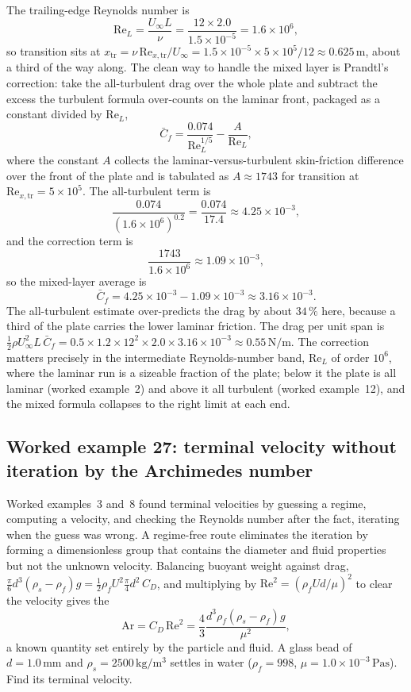 The trailing-edge Reynolds number is
\[
\text{Re}_L = \frac{U_\infty L}{\nu} = \frac{12\times2.0}{1.5\times
10^{-5}} = 1.6\times10^{6},
\]
so transition sits at $x_{\text{tr}} = \nu\,\text{Re}_{x,\text{tr}}/
U_\infty = 1.5\times10^{-5}\times5\times10^{5}/12 \approx 0.625\,\si{
\meter}$, about a third of the way along. The clean way to handle the
mixed layer is Prandtl's correction: take the all-turbulent drag over
the whole plate and subtract the excess the turbulent formula
over-counts on the laminar front, packaged as a constant divided by
$\text{Re}_L$,
\[
\bar C_f = \frac{0.074}{\text{Re}_L^{1/5}} - \frac{A}{\text{Re}_L},
\]
where the constant $A$ collects the laminar-versus-turbulent
skin-friction difference over the front of the plate and is tabulated
as $A \approx 1743$ for transition at $\text{Re}_{x,\text{tr}} =
5\times10^{5}$. The all-turbulent term is
\[
\frac{0.074}{(1.6\times10^{6})^{0.2}} = \frac{0.074}{17.4} \approx
4.25\times10^{-3},
\]
and the correction term is
\[
\frac{1743}{1.6\times10^{6}} \approx 1.09\times10^{-3},
\]
so the mixed-layer average is
\[
\bar C_f = 4.25\times10^{-3} - 1.09\times10^{-3} \approx 3.16\times
10^{-3}.
\]
The all-turbulent estimate over-predicts the drag by about $34\,\%$
here, because a third of the plate carries the lower laminar friction.
The drag per unit span is $\tfrac12\rho U_\infty^2 L\,\bar C_f = 0.5
\times1.2\times12^2\times2.0\times3.16\times10^{-3} \approx 0.55\,\si{
\newton\per\meter}$. The correction matters precisely in the
intermediate Reynolds-number band, $\text{Re}_L$ of order $10^{6}$,
where the laminar run is a sizeable fraction of the plate; below it the
plate is all laminar (worked example~2) and above it all turbulent
(worked example~12), and the mixed formula collapses to the right limit
at each end.

\subsection*{Worked example 27: terminal velocity without iteration by the Archimedes number}

Worked examples~3 and~8 found terminal velocities by guessing a regime,
computing a velocity, and checking the Reynolds number after the fact,
iterating when the guess was wrong. A regime-free route eliminates the
iteration by forming a dimensionless group that contains the diameter
and fluid properties but not the unknown velocity. Balancing buoyant
weight against drag, $\tfrac{\pi}{6}d^3(\rho_s-\rho_f)g = \tfrac12
\rho_f U^2\tfrac{\pi}{4}d^2\,C_D$, and multiplying by $\text{Re}^2 =
(\rho_f U d/\mu)^2$ to clear the velocity gives the 
\[
\text{Ar} = C_D\,\text{Re}^2 = \frac{4}{3}\frac{d^3\rho_f(\rho_s-
\rho_f)g}{\mu^2},
\]
a known quantity set entirely by the particle and fluid. A glass bead
of $d = 1.0\,\si{\milli\meter}$ and $\rho_s = 2500\,\si{\kilogram\per
\meter\cubed}$ settles in water ($\rho_f = 998$, $\mu = 1.0\times
10^{-3}\,\si{\pascal\second}$). Find its terminal velocity.

